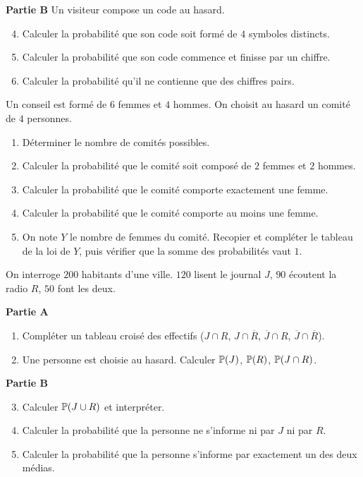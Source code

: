 \textbf{Partie B}
Un visiteur compose un code au hasard.
\begin{enumerate}
	\setcounter{enumi}{3}
	\item Calculer la probabilité que son code soit formé de $4$ symboles
	distincts.
	\item Calculer la probabilité que son code commence et finisse par un
	chiffre.
	\item Calculer la probabilité qu'il ne contienne que des chiffres pairs.
\end{enumerate}

Un conseil est formé de $6$ femmes et $4$ hommes. On choisit au hasard un
comité de $4$ personnes.
\begin{enumerate}
	\item Déterminer le nombre de comités possibles.
	\item Calculer la probabilité que le comité soit composé de $2$ femmes et
	$2$ hommes.
	\item Calculer la probabilité que le comité comporte exactement une femme.
	\item Calculer la probabilité que le comité comporte au moins une femme.
	\item On note $Y$ le nombre de femmes du comité. Recopier et compléter le
	tableau de la loi de $Y$, puis vérifier que la somme des probabilités
	vaut $1$.
\end{enumerate}

On interroge $200$ habitants d'une ville. $120$ lisent le journal $J$,
$90$ écoutent la radio $R$, $50$ font les deux.

\textbf{Partie A}
\begin{enumerate}
	\item Compléter un tableau croisé des effectifs
	($J\cap R$, $J\cap\overline{R}$, $\overline{J}\cap R$,
	$\overline{J}\cap\overline{R}$).
	\item Une personne est choisie au hasard. Calculer $\mathbb{P}(J)$,
	$\mathbb{P}(R)$, $\mathbb{P}(J\cap R)$.
\end{enumerate}

\textbf{Partie B}
\begin{enumerate}
	\setcounter{enumi}{2}
	\item Calculer $\mathbb{P}(J\cup R)$ et interpréter.
	\item Calculer la probabilité que la personne ne s'informe ni par $J$ ni
	par $R$.
	\item Calculer la probabilité que la personne s'informe par exactement un
	des deux médias.
\end{enumerate}
